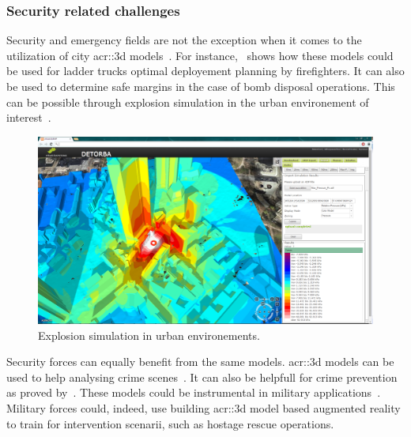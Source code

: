         \subsubsection{Security related challenges}
            Security and emergency fields are not the exception when it comes to the utilization of city \gls{acr::3d} models~\parencite{kwan2005emergency, ruppel2011designing}.
            For instance,~\textcite{chen2014application} shows how these models could be used for ladder trucks optimal deployement planning by firefighters.
            It can also be used to determine safe margins in the case of bomb disposal operations.
            This can be possible through explosion simulation in the urban environement of interest~\parencite{willenborg2015simulation}.\\
            \begin{figure}[htpb]
                \centering
                \includegraphics[width=\textwidth]{images/3d_model_applications/explosion_simulation}            
                \caption{
                    \label{fig::explosion_simulation} Explosion simulation in urban environements.
                }
            \end{figure}
            Security forces can equally benefit from the same models.
            \gls{acr::3d} models can be used to help analysing crime scenes~\parencite{wolff2009towards}.
            It can also be helpfull for crime prevention as proved by~\textcite{wolff2008geospatial}.
            These models could be instrumental in military applications~\textcite{zlatanova2002trends, budroni2010automatic}.
            Military forces could, indeed, use building \gls{acr::3d} model based augmented reality to train for intervention scenarii, such as hostage rescue operations.

